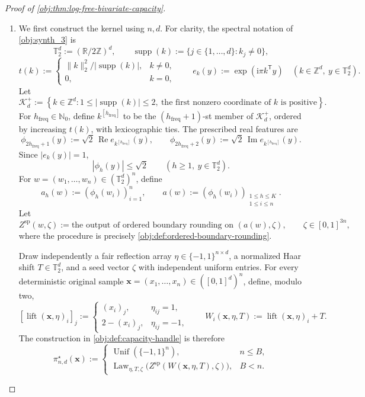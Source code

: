 \documentclass[11pt]{article}
\begin{document}
\begin{proof}[Proof of \cref{obj:thm:log-free-bivariate-capacity}]
\begin{enumerate}
\item
We first construct the kernel using \(n,d\). For clarity, the spectral notation of \cref{obj:synth_3} is
\[
\mathbb T_2^d:=(\mathbb R/2\mathbb Z)^d,
\qquad
\operatorname{supp}(k):=\{j\in\{1,\ldots,d\}:k_j\ne0\},
\]
\[
t(k):=
\begin{cases}
\|k\|_2^2/|\operatorname{supp}(k)|,&k\ne0,\\
0,&k=0,
\end{cases}
\qquad
e_k(y):=\exp(\mathrm i\pi k^{\mathsf T}y)
\quad(k\in\mathbb Z^d,\ y\in\mathbb T_2^d).
\]
Let
\[
\mathscr K_d^+
:=
\left\{
k\in\mathbb Z^d:
1\leq|\operatorname{supp}(k)|\leq2,\
\text{the first nonzero coordinate of }k\text{ is positive}
\right\}.
\]
For \(h_{\mathrm{freq}}\in\mathbb N_0\), define \(k^{[h_{\mathrm{freq}}]}\) to be the
\((h_{\mathrm{freq}}+1)\)-st member of \(\mathscr K_d^+\), ordered by increasing \(t(k)\), with lexicographic ties. The prescribed real features are
\[
\phi_{2h_{\mathrm{freq}}+1}(y)
:=\sqrt2\,\operatorname{Re}e_{k^{[h_{\mathrm{freq}}]}}(y),
\qquad
\phi_{2h_{\mathrm{freq}}+2}(y)
:=\sqrt2\,\operatorname{Im}e_{k^{[h_{\mathrm{freq}}]}}(y).
\]
Since \(|e_k(y)|=1\),
\[
|\phi_h(y)|\leq\sqrt2
\qquad(h\geq1,\ y\in\mathbb T_2^d).
\]
For \(w=(w_1,\ldots,w_n)\in(\mathbb T_2^d)^n\), define
\[
a_h(w):=(\phi_h(w_i))_{i=1}^n,
\qquad
a(w):=(\phi_h(w_i))_{\substack{1\leq h\leq K\\1\leq i\leq n}}.
\]
Let
\[
Z^{\mathrm{sp}}(w,\zeta)
:=
\text{the output of ordered boundary rounding on }(a(w),\zeta),
\qquad
\zeta\in[0,1]^{3n},
\]
where the procedure is precisely \cref{obj:def:ordered-boundary-rounding}.

Draw independently a fair reflection array
\(\eta\in\{-1,1\}^{n\times d}\), a normalized Haar shift
\(T\in\mathbb T_2^d\), and a seed vector \(\zeta\) with independent uniform entries.
For every deterministic original sample
\(\mathbf x=(x_1,\ldots,x_n)\in([0,1]^d)^n\), define, modulo two,
\[
[\operatorname{lift}(\mathbf x,\eta)_i]_j
:=
\begin{cases}
(x_i)_j,&\eta_{ij}=1,\\
2-(x_i)_j,&\eta_{ij}=-1,
\end{cases}
\qquad
W_i(\mathbf x,\eta,T)
:=
\operatorname{lift}(\mathbf x,\eta)_i+T.
\]
The construction in \cref{obj:def:capacity-handle} is therefore
\[
\pi^\star_{n,d}(\mathbf x)
:=
\begin{cases}
\operatorname{Unif}(\{-1,1\}^n),&n\leq B,\\
\operatorname{Law}_{\eta,T,\zeta}
\bigl(Z^{\mathrm{sp}}(W(\mathbf x,\eta,T),\zeta)\bigr),&B<n.
\end{cases}
\]


\end{enumerate}
\end{proof}
\end{document}
